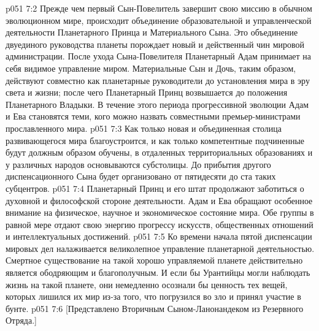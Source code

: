 \vs p051 7:2 Прежде чем первый Сын\hyp{}Повелитель завершит свою миссию в обычном эволюционном мире, происходит объединение образовательной и управленческой деятельности Планетарного Принца и Материального Сына. Это объединение двуединого руководства планеты порождает новый и действенный чин мировой администрации. После ухода Сына\hyp{}Повелителя Планетарный Адам принимает на себя видимое управление миром. Материальные Сын и Дочь, таким образом, действуют совместно как планетарные руководители до установления мира в эру света и жизни; после чего Планетарный Принц возвышается до положения Планетарного Владыки. В течение этого периода прогрессивной эволюции Адам и Ева становятся теми, кого можно назвать совместными премьер\hyp{}министрами прославленного мира.
\vs p051 7:3 Как только новая и объединенная столица развивающегося мира благоустроится, и как только компетентные подчиненные будут должным образом обучены, в отдаленных территориальных образованиях и у различных народов основываются субстолицы. До прибытия другого диспенсационного Сына будет организовано от пятидесяти до ста таких субцентров.
\vs p051 7:4 Планетарный Принц и его штат продолжают заботиться о духовной и философской стороне деятельности. Адам и Ева обращают особенное внимание на физическое, научное и экономическое состояние мира. Обе группы в равной мере отдают свою энергию прогрессу искусств, общественных отношений и интеллектуальных достижений.
\vs p051 7:5 Ко времени начала пятой диспенсации мировых дел налаживается великолепное управление планетарной деятельностью. Смертное существование на такой хорошо управляемой планете действительно является ободряющим и благополучным. И если бы Урантийцы могли наблюдать жизнь на такой планете, они немедленно осознали бы ценность тех вещей, которых лишился их мир из\hyp{}за того, что погрузился во зло и принял участие в бунте.
\vs p051 7:6 [Представлено Вторичным Сыном\hyp{}Ланонандеком из Резервного Отряда.]
